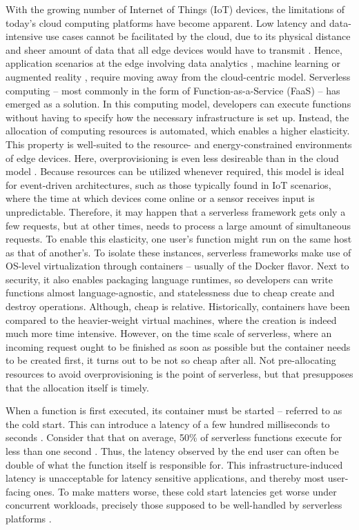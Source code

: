 With the growing number of Internet of Things (IoT) devices, the limitations of today's cloud computing platforms have become apparent. Low latency and data-intensive use cases cannot be facilitated by the cloud, due to its physical distance and sheer amount of data that all edge devices would have to transmit \cite{Aslanpour2021}.
Hence, application scenarios at the edge involving data analytics \cite{Nastic2017}, machine learning \cite{Rausch2019} or augmented reality \cite{Baresi2019}, require moving away from the cloud-centric model. Serverless computing -- most commonly in the form of Function-as-a-Service (FaaS) -- has emerged as a solution.
In this computing model, developers can execute functions without having to specify how the necessary infrastructure is set up. Instead, the allocation of computing resources is automated, which enables a higher elasticity. This property is well-suited to the resource- and energy-constrained environments of edge devices. Here, overprovisioning is even less desireable than in the cloud model \cite{Aslanpour2021}.
Because resources can be utilized whenever required, this model is ideal for event-driven architectures, such as those typically found in IoT scenarios, where the time at which devices come online or a sensor receives input is unpredictable. Therefore, it may happen that a serverless framework gets only a few requests, but at other times, needs to process a large amount of simultaneous requests.
To enable this elasticity, one user's function might run on the same host as that of another's. To isolate these instances, serverless frameworks make use of OS-level virtualization through containers -- usually of the Docker flavor.
Next to security, it also enables packaging language runtimes, so developers can write functions almost language-agnostic, and statelessness due to cheap create and destroy operations. Although, cheap is relative. Historically, containers have been compared to the heavier-weight virtual machines, where the creation is indeed much more time intensive. However, on the time scale of serverless, where an incoming request ought to be finished as soon as possible but the container needs to be created first, it turns out to be not so cheap after all. Not pre-allocating resources to avoid overprovisioning is the point of serverless, but that presupposes that the allocation itself is timely.

When a function is first executed, its container must be started -- referred to as the cold start. This can introduce a latency of a few hundred milliseconds to seconds \cite{Manner2018, Wang2018}. Consider that that on average, 50\% of serverless functions execute for less than one second \cite{Shahrad2020}. Thus, the latency observed by the end user can often be double of what the function itself is responsible for. This infrastructure-induced latency is unacceptable for latency sensitive applications, and thereby most user-facing ones.
To make matters worse, these cold start latencies get worse under concurrent workloads, precisely those supposed to be well-handled by serverless platforms \cite{Mohan2019}.

